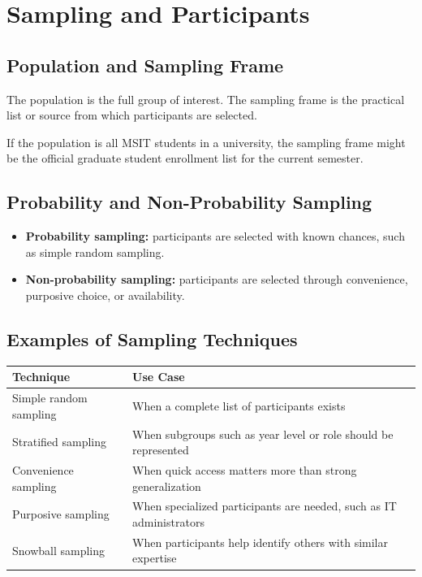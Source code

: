 \documentclass[11pt,a4paper]{article}
\begin{document}
\section{Sampling and Participants}

\subsection{Population and Sampling Frame}

The population is the full group of interest. The sampling frame is the practical list or source from which participants are selected.

\begin{examplebox}
If the population is all MSIT students in a university, the sampling frame might be the official graduate student enrollment list for the current semester.
\end{examplebox}

\subsection{Probability and Non-Probability Sampling}

\begin{itemize}[leftmargin=*]
  \item \textbf{Probability sampling:} participants are selected with known chances, such as simple random sampling.
  \item \textbf{Non-probability sampling:} participants are selected through convenience, purposive choice, or availability.
\end{itemize}

\subsection{Examples of Sampling Techniques}

\begin{longtable}{L{3.0cm}L{8.4cm}}
\toprule
\textbf{Technique} & \textbf{Use Case} \\
\midrule
Simple random sampling & When a complete list of participants exists \\
Stratified sampling & When subgroups such as year level or role should be represented \\
Convenience sampling & When quick access matters more than strong generalization \\
Purposive sampling & When specialized participants are needed, such as IT administrators \\
Snowball sampling & When participants help identify others with similar expertise \\
\bottomrule
\end{longtable}
\end{document}
